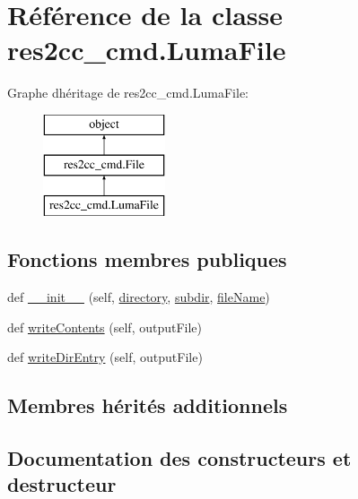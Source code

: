 \hypertarget{classres2cc__cmd_1_1_luma_file}{}\section{Référence de la classe res2cc\+\_\+cmd.\+Luma\+File}
\label{classres2cc__cmd_1_1_luma_file}
Graphe d\textquotesingle{}héritage de res2cc\+\_\+cmd.\+Luma\+File\+:\begin{figure}[H]
\begin{center}
\leavevmode
\includegraphics[height=3.000000cm]{classres2cc__cmd_1_1_luma_file}
\end{center}
\end{figure}
\subsection*{Fonctions membres publiques}
\begin{DoxyCompactItemize}
\item 
def \hyperlink{classres2cc__cmd_1_1_luma_file_a899035d468d17bb1cd25347f91c025b6}{\+\_\+\+\_\+init\+\_\+\+\_\+} (self, \hyperlink{classres2cc__cmd_1_1_file_ac4d2f8723afe8f54e99abc605b1f0cc6}{directory}, \hyperlink{classres2cc__cmd_1_1_file_ae6919ea0849ff51ff2679de78b50f44c}{subdir}, \hyperlink{classres2cc__cmd_1_1_file_ae2daaffd697b334701ec4a53d6c5e86d}{file\+Name})
\item 
def \hyperlink{classres2cc__cmd_1_1_luma_file_a74c9451f0779c7a3bda342c76e1f1f3e}{write\+Contents} (self, output\+File)
\item 
def \hyperlink{classres2cc__cmd_1_1_luma_file_a16c5d82d02e8179e105127796b1e40b3}{write\+Dir\+Entry} (self, output\+File)
\end{DoxyCompactItemize}
\subsection*{Membres hérités additionnels}


\subsection{Documentation des constructeurs et destructeur}
\hypertarget{classres2cc__cmd_1_1_luma_file_a899035d468d17bb1cd25347f91c025b6}{}
